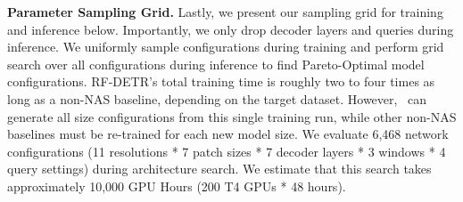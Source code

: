 {
\setlength{\tabcolsep}{1.0em}
\begin{table}[h]
\caption{\textbf{\method-Seg COCO Segmentation Model Config.}}
\label{tab:coco_seg_config}
\end{table}
}

\textbf{Parameter Sampling Grid.} Lastly, we present our sampling grid for training and inference below. Importantly, we only drop decoder layers and queries during inference. We uniformly sample configurations during training and perform grid search over all configurations during inference to find Pareto-Optimal model configurations. RF-DETR’s total training time is roughly two to four times as long as a non-NAS baseline, depending on the target dataset. However, \method \ can generate all size configurations from this single training run, while other non-NAS baselines must be re-trained for each new model size. We evaluate 6,468 network configurations (11 resolutions * 7 patch sizes * 7 decoder layers * 3 windows * 4 query settings) during architecture search. We estimate that this search takes approximately 10,000 GPU Hours (200 T4 GPUs * 48 hours). 

